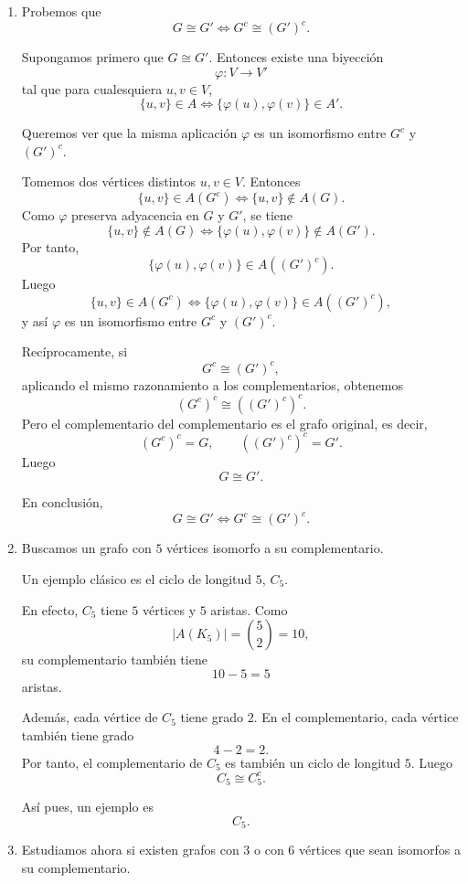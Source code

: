 \documentclass[12pt]{article}
\begin{document}
\begin{enumerate}
    \item Probemos que
    \[
    G \cong G' \iff G^c \cong (G')^c.
    \]

    Supongamos primero que \(G\cong G'\). Entonces existe una biyección
    \[
    \varphi:V\to V'
    \]
    tal que para cualesquiera \(u,v\in V\),
    \[
    \{u,v\}\in A \iff \{\varphi(u),\varphi(v)\}\in A'.
    \]

    Queremos ver que la misma aplicación \(\varphi\) es un isomorfismo entre \(G^c\) y \((G')^c\).

    Tomemos dos vértices distintos \(u,v\in V\). Entonces
    \[
    \{u,v\}\in A(G^c)
    \iff
    \{u,v\}\notin A(G).
    \]
    Como \(\varphi\) preserva adyacencia en \(G\) y \(G'\), se tiene
    \[
    \{u,v\}\notin A(G)
    \iff
    \{\varphi(u),\varphi(v)\}\notin A(G').
    \]
    Por tanto,
    \[
    \{\varphi(u),\varphi(v)\}\in A((G')^c).
    \]
    Luego
    \[
    \{u,v\}\in A(G^c)
    \iff
    \{\varphi(u),\varphi(v)\}\in A((G')^c),
    \]
    y así \(\varphi\) es un isomorfismo entre \(G^c\) y \((G')^c\).

    Recíprocamente, si
    \[
    G^c \cong (G')^c,
    \]
    aplicando el mismo razonamiento a los complementarios, obtenemos
    \[
    (G^c)^c \cong ((G')^c)^c.
    \]
    Pero el complementario del complementario es el grafo original, es decir,
    \[
    (G^c)^c=G, \qquad ((G')^c)^c=G'.
    \]
    Luego
    \[
    G\cong G'.
    \]

    En conclusión,
    \[
    \boxed{G\cong G' \iff G^c\cong (G')^c.}
    \]

    \item Buscamos un grafo con \(5\) vértices isomorfo a su complementario.

    Un ejemplo clásico es el ciclo de longitud \(5\), \(C_5\).

    En efecto, \(C_5\) tiene \(5\) vértices y \(5\) aristas. Como
    \[
    |A(K_5)|=\binom{5}{2}=10,
    \]
    su complementario también tiene
    \[
    10-5=5
    \]
    aristas.

    Además, cada vértice de \(C_5\) tiene grado \(2\). En el complementario, cada vértice también tiene grado
    \[
    4-2=2.
    \]
    Por tanto, el complementario de \(C_5\) es también un ciclo de longitud \(5\). Luego
    \[
    C_5 \cong C_5^c.
    \]

    Así pues, un ejemplo es
    \[
    \boxed{C_5.}
    \]

    \item Estudiamos ahora si existen grafos con \(3\) o con \(6\) vértices que sean isomorfos a su complementario.


\end{enumerate}
\end{document}
